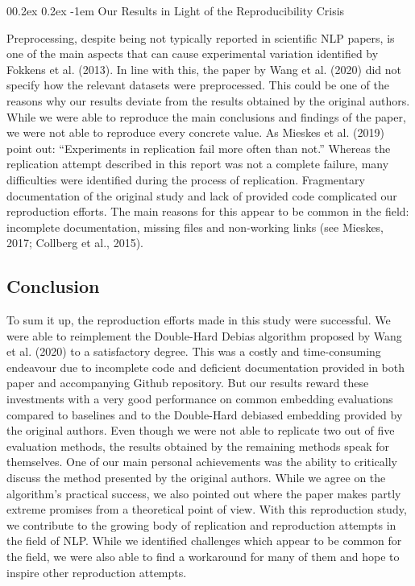 \documentclass[
  english,
  man,floatsintext]{apa6}
\makeatletter
\let\oldparagraph\paragraph
\renewcommand{\paragraph}[1]{\oldparagraph{#1}\mbox{}}
\renewcommand{\paragraph}{\@startsection{paragraph}{4}{\parindent}%
  {0\baselineskip \@plus 0.2ex \@minus 0.2ex}%
  {-1em}%
  {\normalfont\normalsize\bfseries\itshape\typesectitle}}
\makeatother
\begin{document}
\hypertarget{our-results-in-light-of-the-reproducibility-crisis}{%
\paragraph{Our Results in Light of the Reproducibility Crisis}\label{our-results-in-light-of-the-reproducibility-crisis}}

Preprocessing, despite being not typically reported in scientific NLP papers, is one of the main aspects that can cause experimental variation identified by Fokkens et al. (2013). In line with this, the paper by Wang et al. (2020) did not specify how the relevant datasets were preprocessed. This could be one of the reasons why our results deviate from the results obtained by the original authors. While we were able to reproduce the main conclusions and findings of the paper, we were not able to reproduce every concrete value. As Mieskes et al. (2019) point out: \enquote{Experiments in replication fail more often than not.} Whereas the replication attempt described in this report was not a complete failure, many difficulties were identified during the process of replication. Fragmentary documentation of the original study and lack of provided code complicated our reproduction efforts. The main reasons for this appear to be common in the field: incomplete documentation, missing files and non-working links (see Mieskes, 2017; Collberg et al., 2015).

\hypertarget{conclusion}{%
\subsection{Conclusion}\label{conclusion}}

To sum it up, the reproduction efforts made in this study were successful. We were able to reimplement the Double-Hard Debias algorithm proposed by Wang et al. (2020) to a satisfactory degree. This was a costly and time-consuming endeavour due to incomplete code and deficient documentation provided in both paper and accompanying Github repository. But our results reward these investments with a very good performance on common embedding evaluations compared to baselines and to the Double-Hard debiased embedding provided by the original authors. Even though we were not able to replicate two out of five evaluation methods, the results obtained by the remaining methods speak for themselves. One of our main personal achievements was the ability to critically discuss the method presented by the original authors. While we agree on the algorithm's practical success, we also pointed out where the paper makes partly extreme promises from a theoretical point of view. With this reproduction study, we contribute to the growing body of replication and reproduction attempts in the field of NLP. While we identified challenges which appear to be common for the field, we were also able to find a workaround for many of them and hope to inspire other reproduction attempts.
\end{document}

